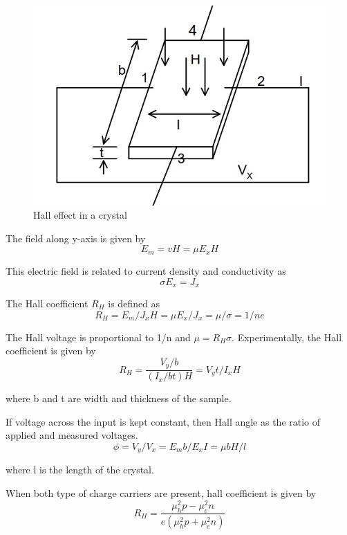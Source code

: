 \documentclass[a4paper, amsfonts, amssymb, amsmath, reprint, showkeys, nofootinbib, twoside]{revtex4-1}
\begin{document}
\begin{figure}[H]
	\centering
	\includegraphics[scale=0.36]{1} 
	\caption{Hall effect in a crystal}
	\label{1}
\end{figure}

The field along y-axis is given by 
\begin{equation}
	E_m=vH=\mu E_x H
\end{equation}

This electric field is related to current density and conductivity as
\begin{equation}
	\sigma E_x=J_x
\end{equation}

The Hall coefficient $R_H$ is defined as 
\begin{equation}
	R_H=E_m/J_x H=\mu E_x /J_x=\mu/\sigma=1/ne
\end{equation}

The Hall voltage is proportional to 1/n and $ \mu =R_H \sigma $. Experimentally, the Hall coefficient is given by 
\begin{equation}
	R_H=\frac{V_y /b}{(I_x/bt)H}=V_y t/I_x H
\end{equation}

where b and t are width and thickness of the sample.

If voltage across the input is kept constant, then Hall angle as the ratio of applied and measured voltages.
\begin{equation}
	\phi=V_y/V_x=E_m b/E_x I=\mu b H/l 
\end{equation}

where l is the length of the crystal. 

When both type of charge carriers are present, hall coefficient is given by 
\begin{equation}
	R_H=\frac{\mu_h^2p-\mu_e^2n}{e(\mu_h^2p+\mu_e^2n)}
\end{equation}
\end{document}

